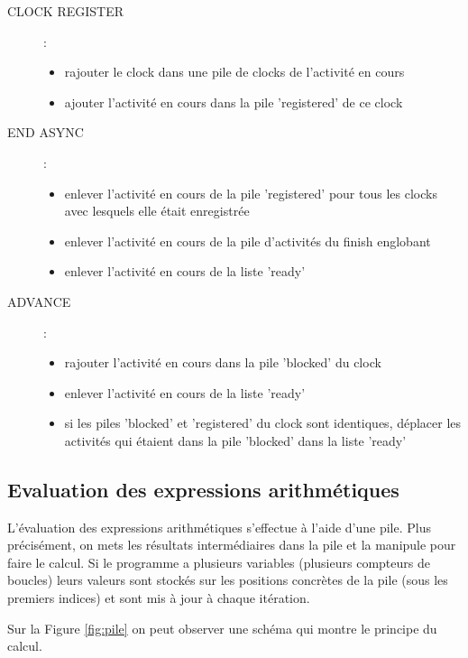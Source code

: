 \documentclass[12pt]{scrartcl}
\begin{document}
\begin{description}
   \item[CLOCK REGISTER]:
    \begin{itemize} 
      \item rajouter le clock dans une pile de clocks de l'activité en cours
      \item ajouter l'activité en cours dans la pile 'registered' de ce clock
    \end{itemize} 

   \item [END ASYNC] :
    \begin{itemize} 
      \item enlever l'activité en cours de la pile 'registered' pour tous les clocks avec lesquels elle était enregistrée
      \item enlever l'activité en cours de la pile d'activités du finish englobant
      \item enlever l'activité en cours de la liste 'ready'
    \end{itemize} 

   \item [ADVANCE] :
    \begin{itemize} 
      \item rajouter l'activité en cours dans la pile 'blocked' du clock
      \item enlever l'activité en cours de la liste 'ready'
      \item si les piles 'blocked' et 'registered' du clock sont identiques, 
      déplacer les activités qui étaient dans la pile 'blocked' dans la liste 'ready'
    \end{itemize} 

\end{description}

\subsection{Evaluation des expressions arithmétiques}
L'évaluation des expressions arithmétiques s'effectue à l'aide d'une pile. Plus précisément, on mets les résultats intermédiaires
dans la pile et la manipule pour faire le calcul. 
Si le programme a plusieurs variables (plusieurs compteurs de boucles) leurs valeurs sont stockés sur les positions concrètes 
de la pile (sous les premiers indices) et sont mis à jour à chaque itération. 

Sur la Figure \ref{fig:pile} on peut observer une schéma qui montre le principe du calcul. 
\end{document}
